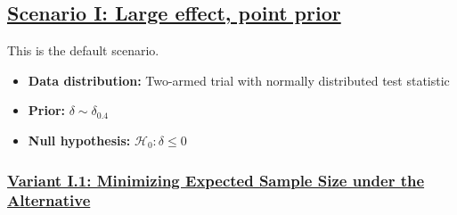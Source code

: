 \documentclass[]{book}
\providecommand{\tightlist}{%
  \setlength{\itemsep}{0pt}\setlength{\parskip}{0pt}}
\begin{document}
\hypertarget{scenario-i-large-effect-point-prior}{%
\subsection{\texorpdfstring{\protect\hyperlink{scenarioI}{Scenario I: Large effect, point prior}}{Scenario I: Large effect, point prior}}\label{scenario-i-large-effect-point-prior}}

This is the default scenario.

\begin{itemize}
\tightlist
\item
  \textbf{Data distribution:} Two-armed trial with normally distributed test statistic
\item
  \textbf{Prior:} \(\delta\sim\delta_{0.4}\)
\item
  \textbf{Null hypothesis:} \(\mathcal{H}_0:\delta \leq 0\)
\end{itemize}

\hypertarget{variant-i.1-minimizing-expected-sample-size-under-the-alternative}{%
\subsubsection{\texorpdfstring{\protect\hyperlink{variantI_1}{Variant I.1: Minimizing Expected Sample Size under the Alternative}}{Variant I.1: Minimizing Expected Sample Size under the Alternative}}\label{variant-i.1-minimizing-expected-sample-size-under-the-alternative}}
\end{document}
